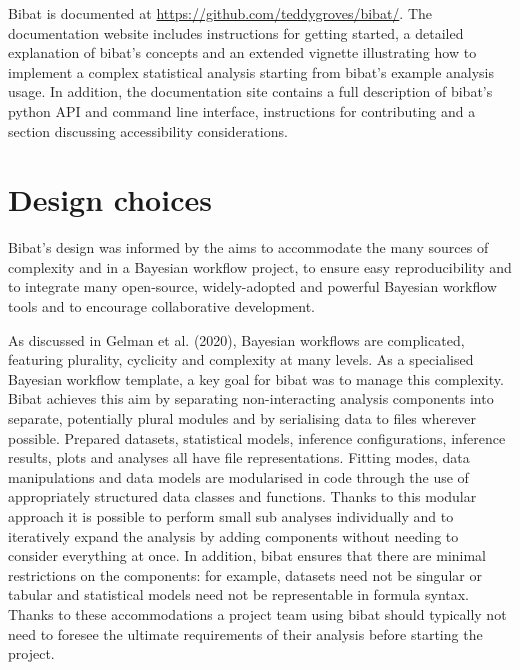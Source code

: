 \documentclass[
  letterpaper,
  DIV=11,
  numbers=noendperiod]{scrartcl}
\begin{document}
Bibat is documented at \url{https://github.com/teddygroves/bibat/}. The
documentation website includes instructions for getting started, a
detailed explanation of bibat's concepts and an extended vignette
illustrating how to implement a complex statistical analysis starting
from bibat's example analysis usage. In addition, the documentation site
contains a full description of bibat's python API and command line
interface, instructions for contributing and a section discussing
accessibility considerations.

\section{Design choices}\label{design-choices}

Bibat's design was informed by the aims to accommodate the many sources
of complexity and in a Bayesian workflow project, to ensure easy
reproducibility and to integrate many open-source, widely-adopted and
powerful Bayesian workflow tools and to encourage collaborative
development.

As discussed in Gelman et al. (2020), Bayesian workflows are
complicated, featuring plurality, cyclicity and complexity at many
levels. As a specialised Bayesian workflow template, a key goal for
bibat was to manage this complexity. Bibat achieves this aim by
separating non-interacting analysis components into separate,
potentially plural modules and by serialising data to files wherever
possible. Prepared datasets, statistical models, inference
configurations, inference results, plots and analyses all have file
representations. Fitting modes, data manipulations and data models are
modularised in code through the use of appropriately structured data
classes and functions. Thanks to this modular approach it is possible to
perform small sub analyses individually and to iteratively expand the
analysis by adding components without needing to consider everything at
once. In addition, bibat ensures that there are minimal restrictions on
the components: for example, datasets need not be singular or tabular
and statistical models need not be representable in formula syntax.
Thanks to these accommodations a project team using bibat should
typically not need to foresee the ultimate requirements of their
analysis before starting the project.
\end{document}
